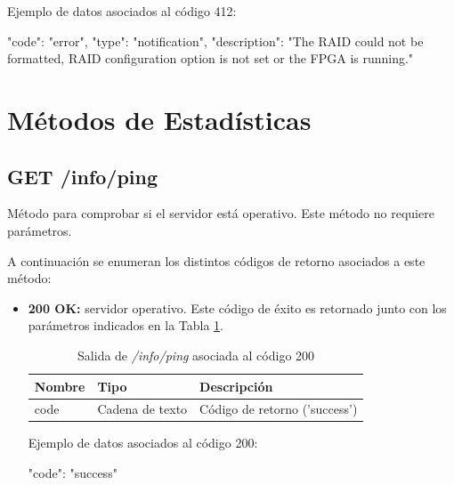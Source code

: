 \begin{itemize}
{\begin{minipage}{\textwidth}
Ejemplo de datos asociados al código 412:

\begin{code}[language=json]
{
  "code": "error",
  "type": "notification",
  "description": "The RAID could not be formatted, RAID configuration option is not set or the FPGA is running."
}
\end{code}
\end{minipage}
}

\end{itemize}



\section{Métodos de Estadísticas \label{extra:api:estadisticas}}

%
%
\subsection{GET /info/ping}
Método para comprobar si el servidor está operativo. Este método no requiere parámetros.

A continuación se enumeran los distintos códigos de retorno asociados a este método:
\begin{itemize}

\item{\textbf{200 OK:} servidor operativo. Este código de éxito es retornado junto con los parámetros indicados en la Tabla \ref{extra:api:infoping:ok}.
\begin{table}[H]
\centering
\begin{tabular}{|l|l|l|}
\hline
\rowcolor[HTML]{F5F5F5}
\textbf{Nombre}  & \textbf{Tipo}   & \textbf{Descripción}              \\ \hline
code             & Cadena de texto & Código de retorno ('success')     \\ \hline
\end{tabular}
\caption{Salida de \textit{/info/ping} asociada al código 200}
\label{extra:api:infoping:ok}
\end{table}
\begin{minipage}{\textwidth}
Ejemplo de datos asociados al código 200:

\begin{code}[language=json]
{
  "code": "success"
}
\end{code}
\end{minipage}
}

\end{itemize}

